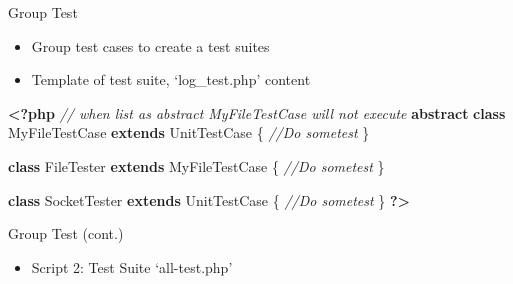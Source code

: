 \documentclass[
  ignorenonframetext,
]{beamer}
\newenvironment{Shaded}{\begin{snugshade}}{\end{snugshade}}
\newcommand{\CommentTok}[1]{\textcolor[rgb]{0.56,0.35,0.01}{\textit{#1}}}
\newcommand{\ConstantTok}[1]{\textcolor[rgb]{0.00,0.00,0.00}{#1}}
\newcommand{\KeywordTok}[1]{\textcolor[rgb]{0.13,0.29,0.53}{\textbf{#1}}}
\newcommand{\NormalTok}[1]{#1}
\newcommand{\OtherTok}[1]{\textcolor[rgb]{0.56,0.35,0.01}{#1}}
\newcommand{\StringTok}[1]{\textcolor[rgb]{0.31,0.60,0.02}{#1}}
\newcommand{\VariableTok}[1]{\textcolor[rgb]{0.00,0.00,0.00}{#1}}
\providecommand{\tightlist}{%
  \setlength{\itemsep}{0pt}\setlength{\parskip}{0pt}}
\begin{document}
\begin{frame}[fragile]{Group Test}
\protect\hypertarget{group-test}{}
\begin{itemize}
\tightlist
\item
  Group test cases to create a test suites
\item
  Template of test suite, `log\_test.php' content
\end{itemize}

\begin{Shaded}
\begin{Highlighting}[]

\KeywordTok{\textless{}?php}
\CommentTok{// when list as abstract MyFileTestCase will not execute}
\KeywordTok{abstract} \KeywordTok{class} \ConstantTok{M}\NormalTok{yFileTestCase }\KeywordTok{extends} \ConstantTok{U}\NormalTok{nitTestCase \{ }
 \CommentTok{//Do sometest}
\NormalTok{ \}}

\KeywordTok{class} \ConstantTok{F}\NormalTok{ileTester }\KeywordTok{extends} \ConstantTok{M}\NormalTok{yFileTestCase \{ }
 \CommentTok{//Do sometest}
\NormalTok{ \}}

\KeywordTok{class} \ConstantTok{S}\NormalTok{ocketTester }\KeywordTok{extends} \ConstantTok{U}\NormalTok{nitTestCase \{ }
 \CommentTok{//Do sometest}
\NormalTok{ \}}
\KeywordTok{?\textgreater{}}
\end{Highlighting}
\end{Shaded}
\end{frame}

\begin{frame}[fragile]{Group Test (cont.)}
\protect\hypertarget{group-test-cont.}{}
\begin{itemize}
\tightlist
\item
  Script 2: Test Suite `all-test.php'
\end{itemize}

\begin{Shaded}
\end{Shaded}
\end{frame}
\end{document}
